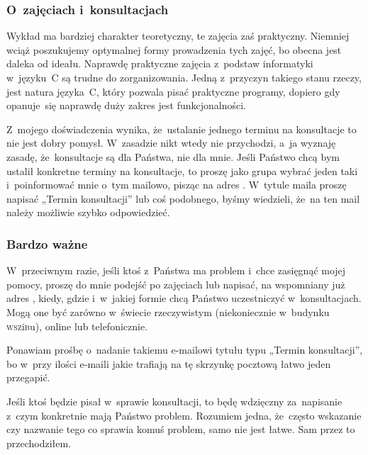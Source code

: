 \documentclass[10pt,t]{beamer}
\begin{document}
\begin{frame}
  \frametitle{O~zajęciach i~konsultacjach}


  Wykład ma bardziej charakter teoretyczny, te zajęcia zaś
  \alert{praktyczny}. Niemniej wciąż poszukujemy optymalnej formy
  prowadzenia tych zajęć, bo obecna jest daleka od ideału. Naprawdę
  praktyczne zajęcia z~podstaw informatyki w~języku~C są trudne do
  zorganizowania. Jedną z~przyczyn takiego stanu rzeczy, jest natura
  języka~C, który pozwala pisać praktyczne programy, dopiero gdy opanuje~się
  naprawdę duży zakres jest funkcjonalności.

  Z~mojego doświadczenia wynika, że~ustalanie jednego terminu na konsultacje
  to nie jest dobry pomysł. W~zasadzie nikt wtedy nie przychodzi, a~ja
  wyznaję zasadę, że~konsultacje są dla Państwa, nie dla mnie. Jeśli
  Państwo chcą bym ustalił konkretne terminy na konsultacje, to proszę jako
  grupa wybrać jeden taki i~poinformować mnie o~tym mailowo, pisząc na
  adres \email. W~tytule maila proszę napisać „Termin konsultacji” lub
  coś podobnego, byśmy wiedzieli, że~na ten mail należy możliwie szybko
  odpowiedzieć.

\end{frame}





\begin{frame}
  \frametitle{Bardzo ważne}


  W~przeciwnym razie, jeśli ktoś z~Państwa ma problem i~chce zasięgnąć
  mojej pomocy, proszę do mnie podejść po zajęciach lub napisać, na
  wspomniany już adres \email, kiedy, gdzie i~w~jakiej formie chcą Państwo
  uczestniczyć w~konsultacjach. Mogą one być zarówno w~świecie rzeczywistym
  (niekoniecznie w~budynku \textsc{wsz}i\textsc{b}u), online lub
  telefonicznie.

  Ponawiam prośbę o~nadanie takiemu e-mailowi tytułu typu „Termin
  konsultacji”, bo w~przy ilości e-maili jakie trafiają na tę skrzynkę
  pocztową łatwo jeden przegapić.

  Jeśli ktoś będzie pisał w~sprawie konsultacji, to będę wdzięczny
  za~napisanie z~czym konkretnie mają Państwo problem. Rozumiem jedna,
  że~często wskazanie czy nazwanie tego co sprawia komuś problem, samo nie
  jest łatwe. Sam przez to przechodziłem.

\end{frame}
\end{document}
